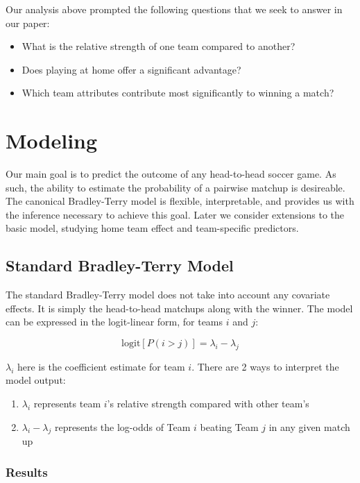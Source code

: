 \documentclass{article}
\begin{document}
Our analysis above prompted the following questions that we seek to answer in our paper:

\begin{itemize}
	\item What is the relative strength of one team compared to another?
	\item Does playing at home offer a significant advantage?
	\item Which team attributes contribute most significantly to winning a match?
\end{itemize}

\section{Modeling}

Our main goal is to predict the outcome of any head-to-head soccer game. As such, the ability to estimate the probability of a pairwise matchup is desireable. The canonical Bradley-Terry model is flexible, interpretable, and provides us with the inference necessary to achieve this goal. Later we consider extensions to the basic model, studying home team effect and team-specific predictors. 

\subsection{Standard Bradley-Terry Model}

The standard Bradley-Terry model does not take into account any covariate effects. It is simply the head-to-head matchups along with the winner. The model can be expressed in the logit-linear form, for teams $i$ and $j$:

$$\text{logit}[P(i > j)] = \lambda_i - \lambda_j$$

$\lambda_i$ here is the coefficient estimate for team $i$. There are 2 ways to interpret the model output:

\begin{enumerate}
	\item $\lambda_i$ represents team $i$'s relative strength compared with other team's
	\item $\lambda_i - \lambda_j$ represents the log-odds of Team $i$ beating Team $j$ in any given match up
\end{enumerate}

\subsubsection{Results}
\end{document}
